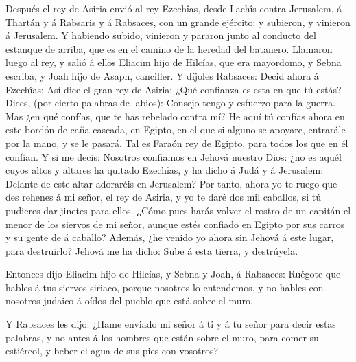  Después el rey de Asiria envió al rey Ezechîas, desde
Lachîs contra Jerusalem, á Thartán y á Rabsaris y á Rabsaces, con un
grande ejército: y subieron, y vinieron á Jerusalem. Y habiendo subido,
vinieron y pararon junto al conducto del estanque de arriba, que es en
el camino de la heredad del batanero.  Llamaron luego al
rey, y salió á ellos Eliacim hijo de Hilcías, que era mayordomo, y Sebna
escriba, y Joah hijo de Asaph, canciller.  Y díjoles
Rabsaces: Decid ahora á Ezechîas: Así dice el gran rey de Asiria: ¿Qué
confianza es esta en que tú estás?  Dices, (por cierto
palabras de labios): Consejo tengo y esfuerzo para la guerra. Mas ¿en
qué confías, que te has rebelado contra mí?  He aquí tú
confías ahora en este bordón de caña cascada, en Egipto, en el que si
alguno se apoyare, entrarále por la mano, y se le pasará. Tal es Faraón
rey de Egipto, para todos los que en él confían.  Y si me
decís: Nosotros confiamos en Jehová nuestro Dios: ¿no es aquél cuyos
altos y altares ha quitado Ezechîas, y ha dicho á Judá y á Jerusalem:
Delante de este altar adoraréis en Jerusalem?  Por tanto,
ahora yo te ruego que des rehenes á mi señor, el rey de Asiria, y yo te
daré dos mil caballos, si tú pudieres dar jinetes para ellos.
 ¿Cómo pues harás volver el rostro de un capitán el menor
de los siervos de mi señor, aunque estés confiado en Egipto por sus
carros y su gente de á caballo?  Además, ¿he venido yo
ahora sin Jehová á este lugar, para destruirlo? Jehová me ha dicho: Sube
á esta tierra, y destrúyela.

 Entonces dijo Eliacim hijo de Hilcías, y Sebna y Joah, á
Rabsaces: Ruégote que hables á tus siervos siriaco, porque nosotros lo
entendemos, y no hables con nosotros judaico á oídos del pueblo que está
sobre el muro.

 Y Rabsaces les dijo: ¿Hame enviado mi señor á ti y á tu
señor para decir estas palabras, y no antes á los hombres que están
sobre el muro, para comer su estiércol, y beber el agua de sus pies con
vosotros?


